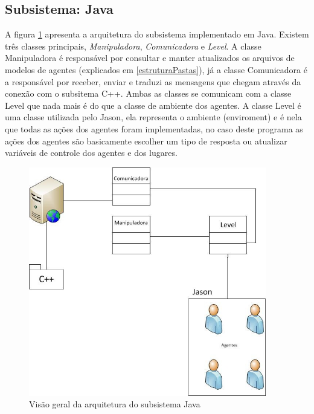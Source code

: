 \subsection{Subsistema: Java}

A figura \ref{arquiteturaJava} apresenta a arquitetura do subsistema implementado em Java. Existem três classes principais, \emph{Manipuladora}, \emph{Comunicadora} e \emph{Level}.
A classe Manipuladora é responsável por consultar e manter atualizados os arquivos de modelos de agentes (explicados em \ref{estruturaPastas}), já a classe Comunicadora é a responsável por receber, enviar e traduzi as mensagens que chegam através da conexão com o subsitema C++. Ambas as classes se comunicam com a classe Level que nada mais é do que a classe de ambiente dos agentes. A classe Level é uma classe utilizada pelo Jason, ela representa o ambiente (enviroment) e é nela que todas as ações dos agentes foram implementadas, no caso deste programa as ações dos agentes são basicamente escolher um tipo de resposta ou atualizar variáveis de controle dos agentes e dos lugares.

\begin{figure}
\centering
\includegraphics[height=10cm]{figuras/arquitetura-java.jpg}
\caption{Visão geral da arquitetura do subsistema Java}
\label{arquiteturaJava}
\end{figure}


